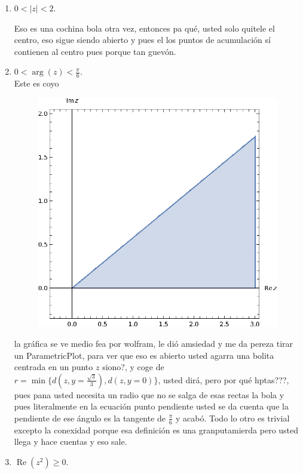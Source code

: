 \documentclass[11pt]{article}
\begin{document}
\begin{enumerate}
\begin{enumerate}
        \item $0 < |z| < 2$.
        
Eso es una cochina bola otra vez, entonces pa qué, usted solo quitele el centro, eso sigue siendo abierto y pues el los puntos de acumulación sí contienen al centro pues porque tan guevón.

        \item $0 < \arg(z) < \frac{\pi}{6}$.\\

        Este es coyo
        
 \begin{figure}[H]
         \centering
         \includegraphics[scale=0.85]{Graphics/8e.eps}
         \end{figure}

la gráfica se ve medio fea por wolfram, le dió amsiedad y me da pereza tirar un ParametricPlot, para ver que eso es abierto usted agarra una bolita centrada en un punto $z$ siono?, y coge de $r=\min\{d(z,y=\frac{\sqrt{3} }{3}),d(z,y=0)\}$,  usted dirá, pero por qué hptas???, pues pana usted necesita un radio que no se salga de esas rectas la bola y pues literalmente en la ecuación punto pendiente usted se da cuenta que la pendiente de ese ángulo es la tangente de $\frac{\pi}{6}$ y acabó. Todo lo otro es trivial excepto la conexidad porque esa definición es una granputamierda pero usted llega y hace cuentas y eso sale.
        \item $\operatorname{Re}(z^2) \geq 0$.


\end{enumerate}
\end{enumerate}
\end{document}
